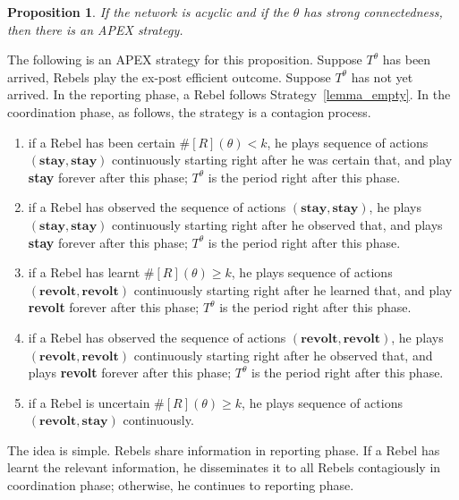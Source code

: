 \documentclass[12pt,letter]{article}
\newtheorem{proposition}{Proposition}[section]
\theoremstyle{definition}
\theoremstyle{remark}
\theoremstyle{claim}
\begin{document}
\begin{proposition}
\label{lemma:small_apex}
If the network is acyclic and if the $\theta$ has strong connectedness, then there is an APEX strategy.
\end{proposition}
The following is an APEX strategy for this proposition. Suppose $T^{\theta}$ has been arrived, Rebels play the ex-post efficient outcome. Suppose $T^{\theta}$ has not yet arrived. In the reporting phase, a Rebel follows Strategy~\ref{lemma_empty}. In the coordination phase, as follows, the strategy is a contagion process. 
\begin{enumerate}
\item if a Rebel has been certain $\#[R](\theta)<k$, he plays sequence of actions $(\textbf{stay},\textbf{stay})$ continuously starting right after he was certain that, and play \textbf{stay} forever after this phase; $T^{\theta}$ is the period right after this phase.
\item if a Rebel has observed the sequence of actions $(\textbf{stay},\textbf{stay})$, he plays $(\textbf{stay},\textbf{stay})$ continuously starting right after he observed that, and plays \textbf{stay} forever after this phase; $T^{\theta}$ is the period right after this phase.
\item if a Rebel has learnt $\#[R](\theta)\geq k$, he plays sequence of actions $(\textbf{revolt},\textbf{revolt})$ continuously starting right after he learned that, and play \textbf{revolt} forever after this phase; $T^{\theta}$ is the period right after this phase.
\item if a Rebel has observed the sequence of actions $(\textbf{revolt},\textbf{revolt})$, he plays $(\textbf{revolt},\textbf{revolt})$ continuously starting right after he observed that, and plays \textbf{revolt} forever after this phase; $T^{\theta}$ is the period right after this phase.
\item if a Rebel is uncertain $\#[R](\theta)\geq k$, he plays sequence of actions $(\textbf{revolt},\textbf{stay})$ continuously.
\end{enumerate} 
The idea is simple. Rebels share information in reporting phase. If a Rebel has learnt the relevant information, he disseminates it to all Rebels contagiously in coordination phase; otherwise, he continues to reporting phase. 
\end{document}
